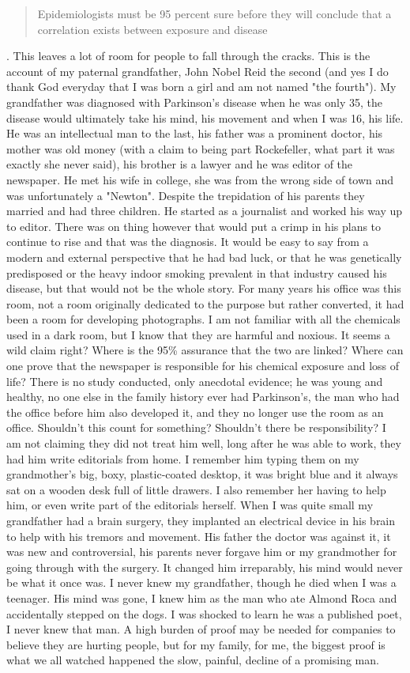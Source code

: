 \documentclass[
    a4paper,
    12pt,
    man,
    donotrepeattitle
]{apa6}
\let \cite \parencite
\begin{document}
\blockquote{Epidemiologists must be 95 percent sure before they will conclude 
that a correlation exists between exposure and disease} \cite[p. 77]{s1}. This 
leaves a lot of
room for people to fall through the cracks. This is the account of my paternal
grandfather, John Nobel Reid the second (and yes I do thank God everyday that
I was born a girl and am not named "the fourth"). My grandfather was diagnosed
with Parkinson's disease when he was only 35, the disease would ultimately take
his mind, his movement and when I was 16, his life. He was an intellectual man
to the last, his father was a prominent doctor, his mother was old money (with
a claim to being part Rockefeller, what part it was exactly she never said),
his brother is a lawyer and he was editor of the newspaper. He met his wife in
college, she was from the wrong side of town and was unfortunately a "Newton".
Despite the trepidation of his parents they married and had three children. He
started as a journalist and worked his way up to editor. There was on thing
however that would put a crimp in his plans to continue to rise and that was
the diagnosis. It would be easy to say from a modern and external perspective
that he had bad luck, or that he was genetically predisposed or the heavy
indoor smoking prevalent in that industry caused his disease, but that would
not be the whole story. For many years his office was this room, not a room
originally dedicated to the purpose but rather converted, it had been a room
for developing photographs. I am not familiar with all the chemicals used in
a dark room, but I know that they are harmful and noxious. It seems a wild
claim right? Where is the 95\% assurance that the two are linked? Where can one
prove that the newspaper is responsible for his chemical exposure and loss of
life? There is no study conducted, only anecdotal evidence; he was young and
healthy, no one else in the family history ever had Parkinson's, the man who
had the office before him also developed it, and they no longer use the room as
an office. Shouldn't this count for something? Shouldn't there be
responsibility? I am not claiming they did not treat him well, long after he
was able to work, they had him write editorials from home. I remember him
typing them on my grandmother's big, boxy, plastic-coated desktop, it was
bright blue and it always sat on a wooden desk full of little drawers. I also
remember her having to help him, or even write part of the editorials herself.
When I was quite small my grandfather had a brain surgery, they implanted an
electrical device in his brain to help with his tremors and movement. His father
the doctor was against it, it was new and controversial, his parents never
forgave him or my grandmother for going through with the surgery. It changed
him irreparably, his mind would never be what it once was. I never knew my
grandfather, though he died when I was a teenager. His mind was gone, I knew
him as the man who ate Almond Roca and accidentally stepped on the dogs. I was
shocked to learn he was a published poet, I never knew that man. A high burden
of proof may be needed for companies to believe they are hurting people, but
for my family, for me, the biggest proof is what we all watched happened the
slow, painful, decline of a promising man.
\end{document}
